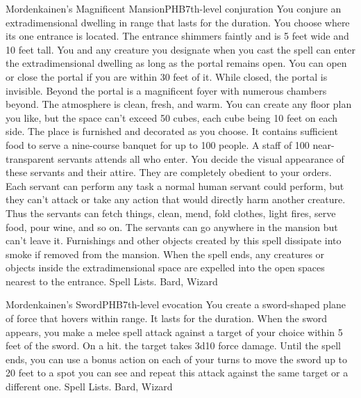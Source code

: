 \begin{spell}{Mordenkainen's Magnificent Mansion}{PHB}{7th-level conjuration}
{
}
You conjure an extradimensional dwelling in range that lasts for the duration. You choose where its one entrance is located. The entrance shimmers faintly and is 5 feet wide and 10 feet tall. You and any creature you designate when you cast the spell can enter the extradimensional dwelling as long as the portal remains open. You can open or close the portal if you are within 30 feet of it. While closed, the portal is invisible.
Beyond the portal is a magnificent foyer with numerous chambers beyond. The atmosphere is clean, fresh, and warm.
You can create any floor plan you like, but the space can’t exceed 50 cubes, each cube being 10 feet on each side. The place is furnished and decorated as you choose. It contains sufficient food to serve a nine-course banquet for up to 100 people. A staff of 100 near-transparent servants attends all who enter. You decide the visual appearance of these servants and their attire. They are completely obedient to your orders. Each servant can perform any task a normal human servant could perform, but they can’t attack or take any action that would directly harm another creature. Thus the servants can fetch things, clean, mend, fold clothes, light fires, serve food, pour wine, and so on. The servants can go anywhere in the mansion but can’t leave it. Furnishings and other objects created by this spell dissipate into smoke if removed from the mansion. When the spell ends, any creatures or objects inside the extradimensional space are expelled into the open spaces nearest to the entrance.
Spell Lists. Bard, Wizard
\end{spell}

\begin{spell}{Mordenkainen's Sword}{PHB}{7th-level evocation}
{
}
You create a sword-shaped plane of force that hovers within range. It lasts for the duration.
When the sword appears, you make a melee spell attack against a target of your choice within 5 feet of the sword. On a hit. the target takes 3d10 force damage. Until the spell ends, you can use a bonus action on each of your turns to move the sword up to 20 feet to a spot you can see and repeat this attack against the same target or a different one.
Spell Lists. Bard, Wizard
\end{spell}

